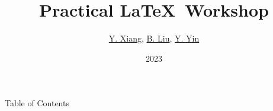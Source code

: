 \documentclass[aspectratio=169]{beamer}
\title{Practical \LaTeX\ Workshop}
\author{\hyperlink{https://github.com/linsyking}{Y. Xiang}, \hyperlink{}{B. Liu}, \hyperlink{https://github.com/fakefred}{Y. Yin}}
\institute{TechJI}
\date{2023}
\begin{document}
\begin{frame}
    \titlepage
\end{frame}

\begin{frame}{Table of Contents}
    \tableofcontents
\end{frame}




\end{document}
